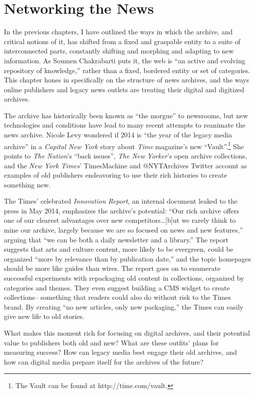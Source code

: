 \chapter{Networking the News}

In the previous chapters, I have outlined the ways in which the archive, and critical notions of it, has shifted from a fixed and graspable entity to a suite of interconnected parts, constantly shifting and morphing and adapting to new information. As Soumen Chakrabarti puts it, the web is ``an active and evolving repository of knowledge,'' rather than a fixed, bordered entity or set of categories. This chapter hones in specifically on the structure of news archives, and the ways online publishers and legacy news outlets are treating their digital and digitized archives.

The archive has historically been known as ``the morgue'' to newsrooms, but new technologies and conditions have lead to many recent attempts to reanimate the news archive. Nicole Levy wondered if 2014 is ``the year of the legacy media archive'' in a \emph{Capital New York} story about \emph{Time} magazine's new ``Vault''.\footnote{The Vault can be found at http://time.com/vault.} She points to \emph{The Nation}'s ``back issues'', \emph{The New Yorker}'s open archive collections, and the \emph{New York Times}' TimesMachine and @NYTArchives Twitter account as examples of old publishers endeavoring to use their rich histories to create something new.\autocite{}

The Times' celebrated \emph{Innovation Report}, an internal document leaked to the press in May 2014, emphasizes the archive's potential: ``Our rich archive offers one of our clearest advantages over new competitors\ldots[b]ut we rarely think to mine our archive, largely because we are so focused on news and new features,'' arguing that ``we can be both a daily newsletter and a library.'' The report suggests that arts and culture content, more likely to be evergreen, could be organized ``more by relevance than by publication date,'' and the topic homepages should be more like guides than wires. The report goes on to enumerate successful experiments with repackaging old content in collections, organized by categories and themes. They even suggest building a CMS widget to create collections-- something that readers could also do without risk to the Times brand. By creating ``no new articles, only new packaging,'' the Times can easily give new life to old stories.

What makes this moment rich for focusing on digital archives, and their potential value to publishers both old and new? What are these outfits' plans for measuring success? How can legacy media best engage their old archives, and how can digital media prepare itself for the archives of the future?

